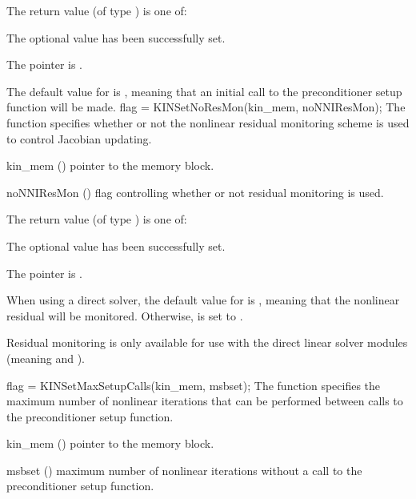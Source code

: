 {
  The return value  (of type ) is one of:
  \begin{args}
  \item[\Id{KIN\_SUCCESS}] 
    The optional value has been successfully set.
  \item[\Id{KIN\_MEM\_NULL}]
    The  pointer is .
  \end{args}
}
{
  The default value for  is , meaning that an initial call
  to the preconditioner setup function will be made.
}
{
flag = KINSetNoResMon(kin\_mem, noNNIResMon);
}
{
  The function  specifies whether or not the nonlinear
  residual monitoring scheme is used to control Jacobian updating.
}
{
  \begin{args}[noNNIResMon]
  \item[kin\_mem] ()
    pointer to the {\kinsol} memory block.
  \item[noNNIResMon] ()
    flag controlling whether or not residual monitoring is used.
  \end{args}
}
{
  The return value  (of type ) is one of:
  \begin{args}
  \item[\Id{KIN\_SUCCESS}] 
    The optional value has been successfully set.
  \item[\Id{KIN\_MEM\_NULL}]
    The  pointer is .
  \end{args}
}
{
  When using a direct solver, the default value for  is ,
  meaning that the nonlinear residual will be monitored. Otherwise, 
  is set to .

  {\warn}Residual monitoring is only available for use with the direct linear solver
  modules (meaning {\kindense} and {\kinband}).
}
{
flag = KINSetMaxSetupCalls(kin\_mem, msbset);
}
{
  The function  specifies the maximum number of 
  nonlinear iterations that can be performed between calls to the 
  preconditioner setup function.
}
{
  \begin{args}
  \item[kin\_mem] ()
    pointer to the {\kinsol} memory block.
  \item[msbset] ()
    maximum number of nonlinear iterations without a call
    to the preconditioner setup function.
  \end{args}
}
